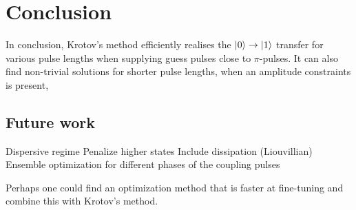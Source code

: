 \documentclass[main.tex]{subfiles}
\begin{document}
\chapter{Conclusion}

In conclusion, Krotov's method efficiently realises the \(\ket{0}\rightarrow\ket{1}\) transfer for various pulse lengths when supplying guess pulses close to \(\pi\)-pulses.
It can also find non-trivial solutions for shorter pulse lengths, when an amplitude constraints is present,


\section{Future work}
Dispersive regime
Penalize higher states
Include dissipation (Liouvillian)
Ensemble optimization for different phases of the coupling pulses

Perhaps one could find an optimization method that is faster at fine-tuning and combine this with Krotov's method.
\end{document}
